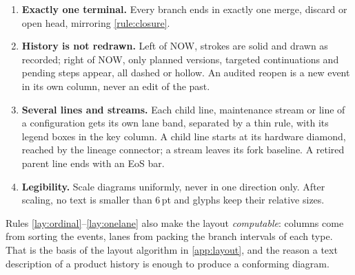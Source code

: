 \begin{enumerate}[label=\textbf{L\arabic*},ref=L\arabic*,leftmargin=*,
    itemsep=2pt,topsep=3pt]
        other than the one they point to.
  \item \label{lay:terminal}\textbf{Exactly one terminal.} Every branch
        ends in exactly one merge, discard or open head, mirroring
        \cref{rule:closure}.
  \item \label{lay:now}\textbf{History is not redrawn.} Left of NOW,
        strokes are solid and drawn as recorded; right of NOW, only planned
        versions, targeted continuations and pending steps appear, all
        dashed or hollow. An audited reopen is a new event in its own
        column, never an edit of the past.
  \item \label{lay:linefork}\textbf{Several lines and streams.} Each child
        line, maintenance stream or line of a configuration gets its own
        lane band, separated by a thin rule, with its legend boxes in the
        key column. A child line starts at its hardware diamond, reached by
        the lineage connector; a stream leaves its fork baseline. A retired
        parent line ends with an \textsf{EoS} bar.
  \item \label{lay:fonts}\textbf{Legibility.} Scale diagrams uniformly,
        never in one direction only. After scaling, no text is smaller than
        6\,pt and glyphs keep their relative sizes.
\end{enumerate}

Rules \ref{lay:ordinal}--\ref{lay:onelane} also make the layout
\emph{computable}: columns come from sorting the events, lanes from
packing the branch intervals of each type. That is the basis of the
layout algorithm in \cref{app:layout}, and the reason a text description
of a product history is enough to produce a conforming diagram.
